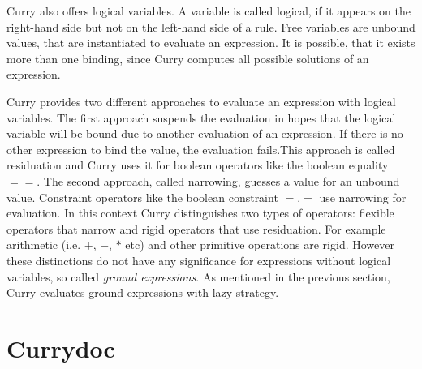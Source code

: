 \documentclass[%
	pdftex,%
	a4paper,%
	oneside,%
	chapterprefix,%
	headsepline,%
	12pt%
]{scrbook}
\begin{document}
Curry also offers logical variables. A variable is called logical, if
it appears on the right-hand side but not on the left-hand side of a
rule. Free variables are unbound values, that are instantiated to
evaluate an expression. It is possible, that it exists more than one
binding, since Curry computes all possible solutions of an expression.


Curry provides two different approaches to evaluate an expression with
logical variables. The first approach suspends the evaluation in hopes
that the logical variable will be bound due to another evaluation of
an expression. If there is no other expression to bind the value, the
evaluation fails.This approach is called residuation and Curry uses it
for boolean operators like the boolean equality \ensuremath{==}.  The second
approach, called narrowing, guesses a value for an unbound
value. Constraint operators like the boolean constraint \ensuremath{\mathbin{=.=}} use
narrowing for evaluation. In this context Curry distinguishes two
types of operators: flexible operators that narrow and rigid operators
that use residuation. For example arithmetic (i.e. \ensuremath{\mathbin{+}}, \ensuremath{\mathbin{-}}, \ensuremath{\mathbin{*}} etc)
and other primitive operations are rigid. However these distinctions
do not have any significance for expressions without logical
variables, so called \emph{ground expressions}. As mentioned in the
previous section, Curry evaluates ground expressions with lazy
strategy.

\section{Currydoc}\label{preliminaries:currydoc}
\end{document}
